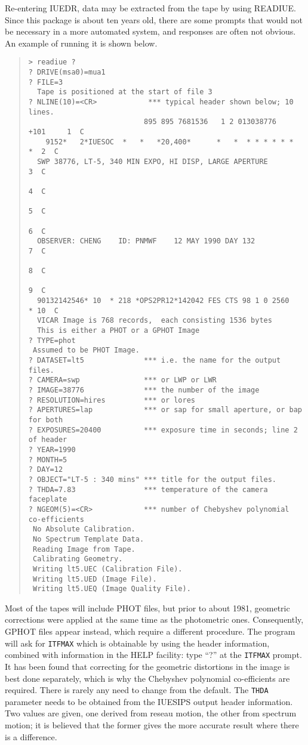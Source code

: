 Re-entering IUEDR, data may be extracted from the tape by using READIUE. 
Since this package is about ten years old, there are some prompts that 
would not be necessary in a more automated system, and responses are 
often not obvious. An example of running it is shown below. 
\begin{quote}
\begin{verbatim}  
> readiue ?
? DRIVE(msa0)=mua1     
? FILE=3
  Tape is positioned at the start of file 3
? NLINE(10)=<CR>            *** typical header shown below; 10 lines.
                           895 895 7681536   1 2 013038776   +101     1  C
    9152*   2*IUESOC  *   *   *20,400*      *   *  * * * * * *     *  2  C
  SWP 38776, LT-5, 340 MIN EXPO, HI DISP, LARGE APERTURE              3  C
                                                                      4  C
                                                                      5  C
                                                                      6  C
  OBSERVER: CHENG    ID: PNMWF    12 MAY 1990 DAY 132                 7  C
                                                                      8  C
                                                                      9  C
  90132142546* 10  * 218 *OPS2PR12*142042 FES CTS 98 1 0 2560      * 10  C
  VICAR Image is 768 records,  each consisting 1536 bytes
  This is either a PHOT or a GPHOT Image
? TYPE=phot
 Assumed to be PHOT Image.
? DATASET=lt5              *** i.e. the name for the output files.
? CAMERA=swp               *** or LWP or LWR
? IMAGE=38776              *** the number of the image
? RESOLUTION=hires         *** or lores
? APERTURES=lap            *** or sap for small aperture, or bap for both
? EXPOSURES=20400          *** exposure time in seconds; line 2 of header
? YEAR=1990
? MONTH=5
? DAY=12
? OBJECT="LT-5 : 340 mins" *** title for the output files. 
? THDA=7.83                *** temperature of the camera faceplate
? NGEOM(5)=<CR>            *** number of Chebyshev polynomial co-efficients
 No Absolute Calibration.
 No Spectrum Template Data.
 Reading Image from Tape.
 Calibrating Geometry.
 Writing lt5.UEC (Calibration File).
 Writing lt5.UED (Image File).
 Writing lt5.UEQ (Image Quality File).
\end{verbatim}
\end{quote}
Most of the tapes will include PHOT files, but prior to about 1981, geometric
corrections were applied at the same time as the photometric ones.
Consequently, GPHOT files appear instead, which require a different procedure. 
The program will ask for {\tt ITFMAX} which is obtainable by using the 
header information, combined with information in the HELP facility: type
``?'' at the {\tt ITFMAX} prompt. It has been found that correcting for 
the geometric distortions in the image is best done separately, which
is why the Chebyshev polynomial co-efficients are required. There is rarely
any need to change from the default. The {\tt THDA} parameter needs to be
obtained from the IUESIPS output header information. Two values are given, 
one derived from reseau motion, the other from spectrum motion; it is 
believed that the former gives the more accurate result where there is a
difference. 

